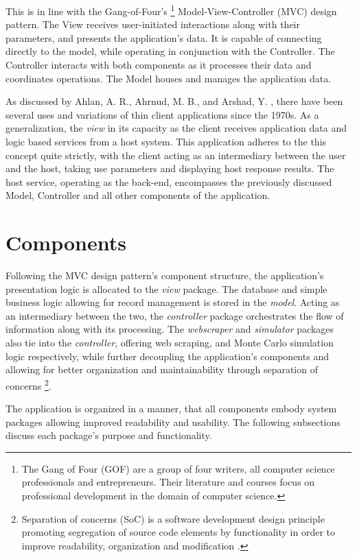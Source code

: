 \documentclass{thesis-ekf}
\theoremstyle{definition}
\theoremstyle{remark}
\begin{document}
This is in line with the Gang-of-Four's \footnote{The Gang of Four \cite{GOF2} (GOF) are a group of four writers, all computer science professionals and entrepreneurs. Their literature and courses focus on professional development in the domain of computer science.} Model-View-Controller (MVC) \cite[p.~529]{GOF} design pattern. The View receives user-initiated interactions along with their parameters, and presents the application's data. It is capable of connecting directly to the model, while operating in conjunction with the Controller. The Controller interacts with both components as it processes their data and coordinates operations. The Model houses and manages the application data.

As discussed by Ahlan, A. R., Ahrnud, M. B., and Arshad, Y. \cite{Kulliyyah}, there have been several uses and variations of thin client applications since the 1970s. As a generalization, the \emph{view} in its capacity as the client receives application data and logic based services from a host system. This application adheres to the this concept quite strictly, with the client acting as an intermediary between the user and the host, taking use parameters and displaying host response results. The host service, operating as the back-end, encompasses the previously discussed Model, Controller and all other components of the application.


\section{Components}
Following the MVC design pattern's component structure, the application's presentation logic is allocated to the \emph{view} package. The database and simple business logic allowing for record management is stored in the \emph{model}. Acting as an intermediary between the two, the \emph{controller} package orchestrates the flow of information along with its processing. The \emph{webscraper} and \emph{simulator} packages also tie into the \emph{controller}, offering web scraping, and Monte Carlo simulation logic respectively, while further decoupling the application's components and allowing for better organization and maintainability through separation of concerns \footnote{Separation of concerns (SoC) is a software development design principle promoting segregation of source code elements by functionality in order to improve readability, organization and modification \cite{Reade}.}.

The application is organized in a manner, that all components embody system packages allowing improved readability and usability. The following subsections discuss each package's purpose and functionality.
\end{document}
